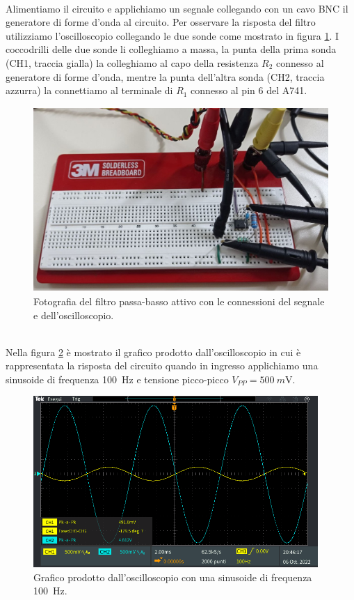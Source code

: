 \documentclass{report}
\begin{document}
\\Alimentiamo il circuito e applichiamo un segnale collegando con un cavo BNC il generatore di forme d'onda al circuito. Per osservare la risposta del filtro utilizziamo l'oscilloscopio collegando le due sonde come mostrato in figura \ref{figura:connessioni}. I coccodrilli delle due sonde li colleghiamo a massa, la punta della prima sonda (CH1, traccia gialla) la colleghiamo al capo della resistenza $R_2$ connesso al generatore di forme d'onda, mentre la punta dell'altra sonda (CH2, traccia azzurra) la connettiamo al terminale di $R_1$ connesso al pin 6 del \textmu A741.
\begin{figure}[h!]
\centering
\includegraphics[height=7cm]{immagini/circuito_sonde}
\caption{Fotografia del filtro passa-basso attivo con le connessioni del segnale e dell'oscilloscopio.}
\label{figura:connessioni}
\end{figure}
\\Nella figura \ref{figura:TEK1} è mostrato il grafico prodotto dall'oscilloscopio in cui è rappresentata la risposta del circuito quando in ingresso applichiamo una sinusoide di frequenza \SI{100}{\hertz} e tensione picco-picco $V_{PP}=\SI{500}{m\volt}$.
\begin{figure}[h!]
	\centering
	\includegraphics[height=6.5cm]{immagini/TEK00001}
	\caption{Grafico prodotto dall'oscilloscopio con una sinusoide di frequenza \SI{100}{\hertz}.}
	\label{figura:TEK1}
\end{figure}
\end{document}
